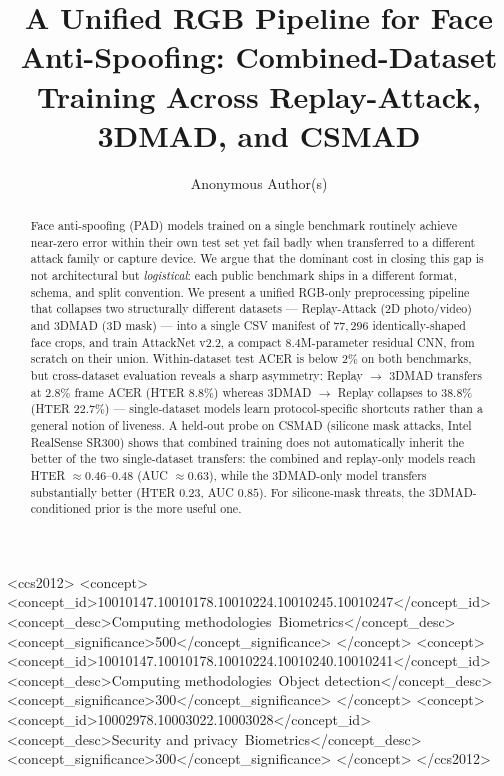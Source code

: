 \documentclass[anonymous, manuscript, screen, review]{acmart}
\title{A Unified RGB Pipeline for Face Anti-Spoofing:
Combined-Dataset Training Across Replay-Attack, 3DMAD, and CSMAD}
\author{Anonymous Author(s)}
\affiliation{%
  \institution{Anonymous Institution}
  \country{}
}
\begin{document}
\begin{abstract}
Face anti-spoofing (PAD) models trained on a single benchmark routinely
achieve near-zero error within their own test set yet fail badly when
transferred to a different attack family or capture device. We argue
that the dominant cost in closing this gap is not architectural but
\emph{logistical}: each public benchmark ships in a different format,
schema, and split convention. We present a unified RGB-only preprocessing
pipeline that collapses two structurally different datasets ---
Replay-Attack (2D photo/video) and 3DMAD (3D mask) --- into a single
CSV manifest of $77{,}296$ identically-shaped face crops, and train
AttackNet v2.2, a compact $8{.}4$M-parameter residual CNN, from scratch
on their union. Within-dataset test ACER is below $2\%$ on both
benchmarks, but cross-dataset evaluation reveals a sharp asymmetry:
Replay $\rightarrow$ 3DMAD transfers at $2{.}8\%$ frame ACER (HTER
$8{.}8\%$) whereas 3DMAD $\rightarrow$ Replay collapses to $38{.}8\%$
(HTER $22{.}7\%$) --- single-dataset models learn protocol-specific
shortcuts rather than a general notion of liveness. A held-out probe on
CSMAD (silicone mask attacks, Intel RealSense SR300) shows that combined
training does not automatically inherit the better of the two
single-dataset transfers: the combined and replay-only models reach
HTER $\approx 0{.}46$--$0{.}48$ (AUC $\approx 0{.}63$), while the
3DMAD-only model transfers substantially better (HTER $0{.}23$, AUC
$0{.}85$). For silicone-mask threats, the 3DMAD-conditioned prior is
the more useful one.
\end{abstract}

\begin{CCSXML}
<ccs2012>
   <concept>
       <concept_id>10010147.10010178.10010224.10010245.10010247</concept_id>
       <concept_desc>Computing methodologies~Biometrics</concept_desc>
       <concept_significance>500</concept_significance>
       </concept>
   <concept>
       <concept_id>10010147.10010178.10010224.10010240.10010241</concept_id>
       <concept_desc>Computing methodologies~Object detection</concept_desc>
       <concept_significance>300</concept_significance>
       </concept>
   <concept>
       <concept_id>10002978.10003022.10003028</concept_id>
       <concept_desc>Security and privacy~Biometrics</concept_desc>
       <concept_significance>300</concept_significance>
       </concept>
 </ccs2012>
\end{CCSXML}

\end{document}
